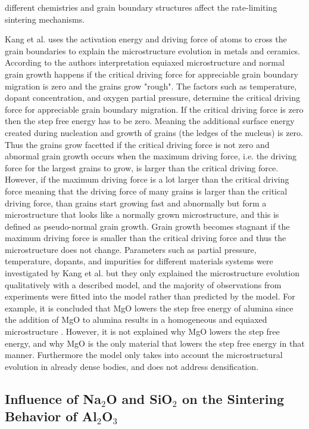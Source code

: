 different chemistries and grain boundary structures affect the rate-limiting sintering mechanisms.

Kang et al. \cite{Dillon2007a,Rohrer2012,Dillon2010,Dillon2007} uses the activation energy and driving force of atoms to cross the grain boundaries to explain the microstructure evolution in metals and ceramics. According to the authors interpretation equiaxed microstructure and normal grain growth happens if the critical driving force for appreciable grain boundary migration is zero and the  grains grow "rough". The factors such as temperature, dopant concentration, and oxygen partial pressure, determine the critical driving force for appreciable grain boundary migration. If the critical driving force is zero then the step free energy has to be zero. Meaning  the additional surface energy created during nucleation and growth of grains (the ledges of the nucleus) is zero. Thus the grains grow facetted if the critical driving force is not zero and abnormal grain growth occurs when the maximum driving force, i.e. the driving force for the largest grains to grow, is larger than the critical driving force. However, if the maximum driving force is a lot larger than the critical driving force meaning that the driving force of many grains is larger than the critical driving force, than grains start growing fast and abnormally but form a microstructure that looks like a normally grown microstructure, and this is defined as pseudo-normal grain growth. Grain growth becomes stagnant if the maximum driving force is smaller than the critical driving force and thus the microstructure does not change. Parameters such as partial pressure, temperature, dopants, and impurities for different materials systems were investigated by Kang et al. but they only explained the microstructure evolution qualitatively with a described model, and the majority of observations from experiments were fitted into the model rather than predicted by the model. For example, it is concluded that MgO lowers the step free energy of alumina since the addition of MgO to alumina results in a homogeneous and equiaxed microstructure \cite{Dillon2010,Dillon2007}. However, it is not explained why MgO lowers the step free energy, and why MgO is the only material that lowers the step free energy in that manner. Furthermore the model only takes into account the microstructural evolution in already dense bodies, and does not address densification.

\subsection{Influence of Na$_{2}$O and SiO$_{2}$ on the Sintering Behavior of Al$_{2}$O$_{3}$}

